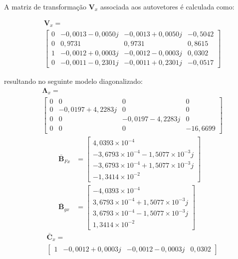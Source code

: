 \documentclass{ppgeesa}
\begin{document}
A matriz de transformação $\mathbf{V}_x$ associada aos autovetores é calculada como:

\begin{align}
&\mathbf{V}_x = \nonumber \\
&\begin{bmatrix} 
    0 & -0{,}0013 - 0{,}0050j & -0{,}0013 + 0{,}0050j & -0{,}5042 \\
    0 & 0{,}9731 & 0{,}9731 & 0{,}8615 \\
    1 & -0{,}0012 + 0{,}0003j & -0{,}0012 - 0{,}0003j & 0{,}0302 \\
    0 & -0{,}0011 - 0{,}2301j & -0{,}0011 + 0{,}2301j & -0{,}0517
\end{bmatrix}
\end{align}

\noindent resultando no seguinte modelo diagonalizado:
\begin{align}
&\mathbf{\Lambda}_x = \nonumber \\
&\begin{bmatrix}
    0 & 0 & 0 & 0 \\
    0 & -0{,}0197 + 4{,}2283j & 0 & 0 \\
    0 & 0 & -0{,}0197 - 4{,}2283j & 0 \\
    0 & 0 & 0 & -16{,}6699
\end{bmatrix}
\end{align}
{\allowdisplaybreaks
\begin{align}
\bar{\mathbf{B}}_{Fx} &= \begin{bmatrix} 4{,}0393 \times 10^{-4} \\ -3{,}6793 \times 10^{-4} - 1{,}5077 \times 10^{-3}j \\ -3{,}6793 \times 10^{-4} + 1{,}5077 \times 10^{-3}j \\ -1{,}3414 \times 10^{-2} \end{bmatrix} \\
\bar{\mathbf{B}}_{gx} &= \begin{bmatrix} -4{,}0393 \times 10^{-4} \\ 3{,}6793 \times 10^{-4} + 1{,}5077 \times 10^{-3}j \\ 3{,}6793 \times 10^{-4} - 1{,}5077 \times 10^{-3}j \\ 1{,}3414 \times 10^{-2} \end{bmatrix}
\end{align}
}
\begin{align}
&\bar{\mathbf{C}}_x = \nonumber \\
&\begin{bmatrix} 1 & -0{,}0012 + 0{,}0003j & -0{,}0012 - 0{,}0003j & 0{,}0302 \end{bmatrix}
\end{align}
\end{document}
